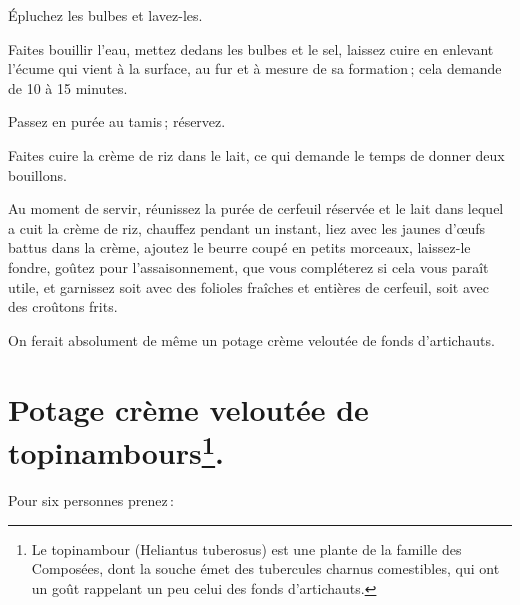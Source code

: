 Épluchez les bulbes et lavez-les.

Faites bouillir l'eau, mettez dedans les bulbes et le sel, laissez cuire en
enlevant l'écume qui vient à la surface, au fur et à mesure de sa formation ;
cela demande de 10 à 15 minutes.

Passez en purée au tamis ; réservez.

Faites cuire la crème de riz dans le lait, ce qui demande le temps de donner
deux bouillons.

Au moment de servir, réunissez la purée de cerfeuil réservée et le lait dans
lequel a cuit la crème de riz, chauffez pendant un instant, liez avec les
jaunes d'œufs battus dans la crème, ajoutez le beurre coupé en petits morceaux,
laissez-le fondre, goûtez pour l’assaisonnement, que vous compléterez si cela
vous paraît utile, et garnissez soit avec des folioles fraîches et entières de
cerfeuil, soit avec des croûtons frits.

\sk

On ferait absolument de même un potage crème veloutée de fonds d'artichauts.

\section*{\centering Potage crème veloutée de topinambours\footnote{
                          Le topinambour (Heliantus tuberosus) est une plante de la 
                          famille des Composées, dont la souche émet des tubercules 
                          charnus comestibles, qui ont un goût rappelant un peu celui 
                          des fonds d'artichauts.}.}


Pour six personnes prenez :

\medskip

